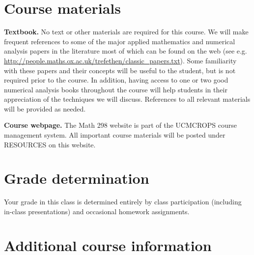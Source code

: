 \documentclass{article}
\begin{document}
\section*{Course materials}

\begin{description}

\item {\bf Textbook.} No text or other materials are required for this course.  We will make frequent references to some of the major applied mathematics and numerical analysis papers in the literature most of which can be found on the web (see e.g. \url{http://people.maths.ox.ac.uk/trefethen/classic_papers.txt}).  Some familiarity with these papers and their concepts will be useful to the student, but is not required prior to the course.  In addition, having access to one or two good numerical analysis books throughout the course will help students in their appreciation of the techniques we will discuss.  References to all relevant materials will be provided as needed.

\item {\bf Course webpage.} The Math 298 website is part of the
  UCMCROPS course management system. All important course materials
  will be posted under RESOURCES on this website.

\end{description}

\section*{Grade determination} 

\begin{description}

\item Your grade in this class is determined entirely by class
  participation (including in-class presentations) and occasional homework assignments.

\end{description}

\section*{Additional course information}
\end{document}
